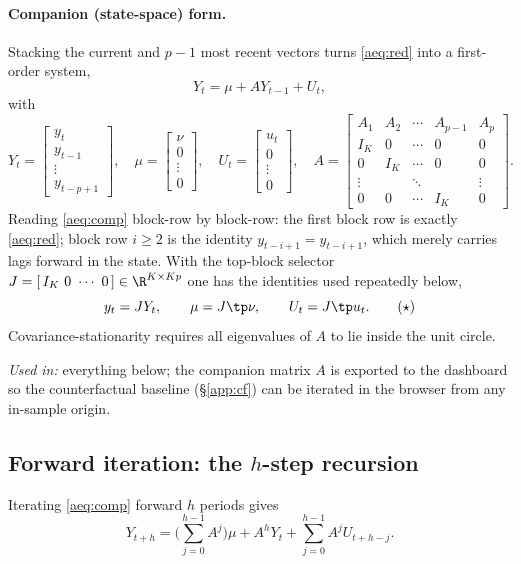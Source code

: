 \paragraph{Companion (state-space) form.} Stacking the current and $p-1$ most
recent vectors turns \eqref{aeq:red} into a first-order system,
\begin{equation}
Y_t=\mu+AY_{t-1}+U_t,
\tag{2}\label{aeq:comp}
\end{equation}
with
\[
Y_t=\begin{bmatrix} y_t\\ y_{t-1}\\ \vdots\\ y_{t-p+1}\end{bmatrix},\quad
\mu=\begin{bmatrix}\nu\\0\\\vdots\\0\end{bmatrix},\quad
U_t=\begin{bmatrix}u_t\\0\\\vdots\\0\end{bmatrix},\quad
A=\begin{bmatrix}
A_1 & A_2 & \cdots & A_{p-1} & A_p\\
I_K & 0 & \cdots & 0 & 0\\
0 & I_K & \cdots & 0 & 0\\
\vdots & & \ddots & & \vdots\\
0 & 0 & \cdots & I_K & 0
\end{bmatrix}.
\]
Reading \eqref{aeq:comp} block-row by block-row: the first block row is exactly
\eqref{aeq:red}; block row $i\ge2$ is the identity $y_{t-i+1}=y_{t-i+1}$, which
merely carries lags forward in the state. With the top-block selector
$J=[\,I_K\ 0\ \cdots\ 0\,]\in\R^{K\times Kp}$ one has the identities used
repeatedly below,
\begin{equation}
y_t=JY_t,\qquad \mu=J\tp\nu,\qquad U_t=J\tp u_t.
\tag{$\star$}\label{aeq:star}
\end{equation}
Covariance-stationarity requires all eigenvalues of $A$ to lie inside the unit
circle.

\medskip
\noindent\textit{Used in:} everything below; the companion matrix $A$ is exported
to the dashboard so the counterfactual baseline (\S\ref{app:cf}) can be iterated
in the browser from any in-sample origin.

\subsection{Forward iteration: the \texorpdfstring{$h$}{h}-step recursion}\label{app:recursion}
Iterating \eqref{aeq:comp} forward $h$ periods gives
\begin{equation}
Y_{t+h}=\Bigg(\sum_{j=0}^{h-1}A^{j}\Bigg)\mu+A^{h}Y_t+\sum_{j=0}^{h-1}A^{j}U_{t+h-j}.
\tag{3}\label{aeq:recursion}
\end{equation}


